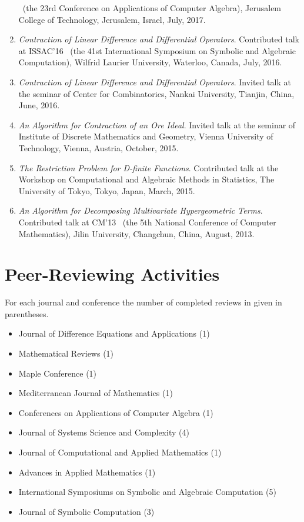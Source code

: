 \documentclass[a4paper,12pt]{article}
\begin{document}
\begin{enumerate}
 \ (the 23rd Conference on Applications of Computer Algebra), Jerusalem College of Technology, Jerusalem, Israel, July, 2017.
 \item {\em Contraction of Linear Difference and Differential Operators}. Contributed talk at ISSAC'16 
 \ (the 41st International Symposium on Symbolic and Algebraic Computation), Wilfrid Laurier University, Waterloo, Canada, July, 2016.
 \item {\em Contraction of Linear Difference and Differential Operators}.
       Invited talk at the seminar of Center for Combinatorics, Nankai University, Tianjin, China, June, 2016.
 \item {\em An Algorithm for Contraction of an Ore Ideal}. Invited talk at the seminar of Institute of Discrete Mathematics and Geometry, 
       Vienna University of Technology, Vienna, Austria, October, 2015.
 \item {\em The Restriction Problem for D-finite Functions}. 
       Contributed talk at the Workshop on Computational and Algebraic Methods in Statistics,
       The University of Tokyo, Tokyo, Japan, March, 2015.
 \item {\em An Algorithm for Decomposing Multivariate Hypergeometric Terms}. Contributed talk at CM'13
       \ (the 5th National Conference of Computer Mathematics), Jilin University, Changchun, China, August, 2013.
\end{enumerate}

\section*{\Large Peer-Reviewing Activities}
For each journal and conference the number of completed reviews in given in parentheses.
\begin{itemize}
\item Journal of Difference Equations and Applications (1)
\item Mathematical Reviews (1)
\item Maple Conference (1)
\item Mediterranean Journal of Mathematics (1)
\item Conferences on Applications of Computer Algebra (1)
 \item Journal of Systems Science and Complexity (4)
 \item Journal of Computational and Applied Mathematics (1)
 \item Advances in Applied Mathematics (1)
 \item International Symposiums on Symbolic and Algebraic Computation (5)
 \item Journal of Symbolic Computation (3)
\end{itemize}
\end{document}
